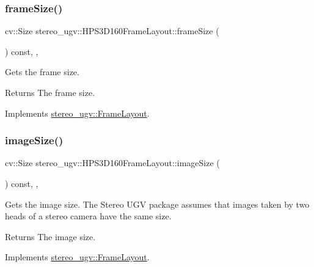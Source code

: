 \subsubsection{\texorpdfstring{frame\+Size()}{frameSize()}}
{\footnotesize\ttfamily cv\+::\+Size stereo\+\_\+ugv\+::\+H\+P\+S3\+D160\+Frame\+Layout\+::frame\+Size (\begin{DoxyParamCaption}{ }\end{DoxyParamCaption}) const\hspace{0.3cm}{\ttfamily [override]}, {\ttfamily [virtual]}, {\ttfamily [noexcept]}}



Gets the frame size. 

\begin{DoxyReturn}{Returns}
The frame size. 
\end{DoxyReturn}


Implements \hyperlink{classstereo__ugv_1_1FrameLayout_a59da4ac9d0cc6a43cccbf8666849bdc2}{stereo\+\_\+ugv\+::\+Frame\+Layout}.

\mbox{\label{classstereo__ugv_1_1HPS3D160FrameLayout_ab7fb47261d8a8132ac0ca7a15b69500e}} 
\subsubsection{\texorpdfstring{image\+Size()}{imageSize()}}
{\footnotesize\ttfamily cv\+::\+Size stereo\+\_\+ugv\+::\+H\+P\+S3\+D160\+Frame\+Layout\+::image\+Size (\begin{DoxyParamCaption}{ }\end{DoxyParamCaption}) const\hspace{0.3cm}{\ttfamily [override]}, {\ttfamily [virtual]}, {\ttfamily [noexcept]}}



Gets the image size. The Stereo U\+GV package assumes that images taken by two heads of a stereo camera have the same size. 

\begin{DoxyReturn}{Returns}
The image size. 
\end{DoxyReturn}


Implements \hyperlink{classstereo__ugv_1_1FrameLayout_a12cc36a89f8e66ffc6a2fa5eb3c5f648}{stereo\+\_\+ugv\+::\+Frame\+Layout}.

